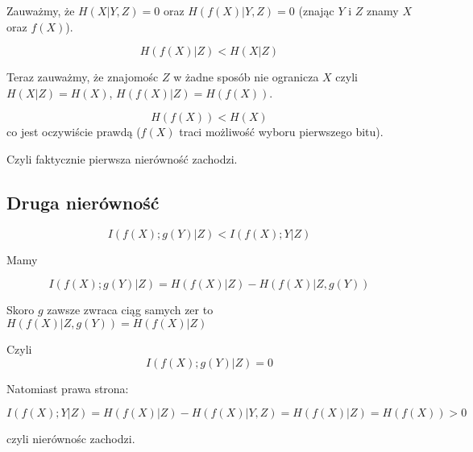 \documentclass{article}
\begin{document}
Zauważmy, że $H(X|Y,Z) = 0$ oraz $H(f(X)|Y,Z) = 0$ (znając $Y$ i $Z$ znamy $X$ oraz $f(X)$).

$$H(f(X)|Z) < H(X|Z)$$

Teraz zauważmy, że znajomośc $Z$ w żadne sposób nie ogranicza $X$ czyli $H(X|Z) = H(X)$,
$H(f(X)|Z) = H(f(X))$.

$$H(f(X)) < H(X)$$
co jest oczywiście prawdą ($f(X)$ traci możliwość wyboru pierwszego bitu).

Czyli faktycznie pierwsza nierówność zachodzi.

\subsection*{Druga nierówność}

$$I(f(X);g(Y)|Z) < I(f(X);Y|Z)$$

Mamy 

$$I(f(X);g(Y)|Z) = H(f(X)|Z) - H(f(X)|Z,g(Y))$$

Skoro $g$ zawsze zwraca ciąg samych zer to $H(f(X)|Z,g(Y)) = H(f(X)|Z)$

Czyli 
$$I(f(X);g(Y)|Z) = 0$$

Natomiast prawa strona:

$$I(f(X);Y|Z) = H(f(X)|Z) - H(f(X)|Y,Z) = H(f(X)|Z) = H(f(X)) > 0$$

czyli nierównośc zachodzi.
\end{document}
